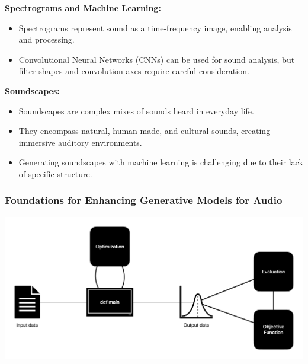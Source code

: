 \begin{frame}
{        \textbf{Spectrograms and Machine Learning:}
        \begin{itemize}
            \item Spectrograms represent sound as a time-frequency image, enabling analysis and processing.
            \item Convolutional Neural Networks (CNNs) can be used for sound analysis, but filter shapes and convolution axes require careful consideration.
        \end{itemize}

        \textbf{Soundscapes:}
        \begin{itemize}
            \item Soundscapes are complex mixes of sounds heard in everyday life.
            \item They encompass natural, human-made, and cultural sounds, creating immersive auditory environments.
            \item Generating soundscapes with machine learning is challenging due to their lack of specific structure.
        \end{itemize}
    }
\end{frame}

\begin{frame}
    \frametitle{Foundations for Enhancing Generative Models for Audio}

    \includegraphics[width=\textwidth]{images/1-introduction/Problem-Definition.pdf}


\end{frame}


